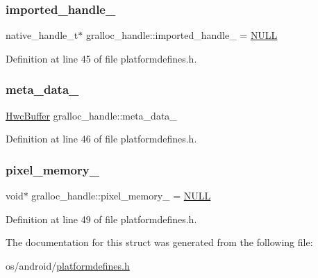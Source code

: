 \subsubsection{\texorpdfstring{imported\+\_\+handle\+\_\+}{imported\_handle\_}}
{\footnotesize\ttfamily native\+\_\+handle\+\_\+t$\ast$ gralloc\+\_\+handle\+::imported\+\_\+handle\+\_\+ = \mbox{\hyperlink{alios_2platformdefines_8h_a070d2ce7b6bb7e5c05602aa8c308d0c4}{N\+U\+LL}}}



Definition at line 45 of file platformdefines.\+h.

\mbox{\label{structgralloc__handle_aa5c246b4955a8c51868b7915c6d512ab}} 
\subsubsection{\texorpdfstring{meta\+\_\+data\+\_\+}{meta\_data\_}}
{\footnotesize\ttfamily \mbox{\hyperlink{structHwcBuffer}{Hwc\+Buffer}} gralloc\+\_\+handle\+::meta\+\_\+data\+\_\+}



Definition at line 46 of file platformdefines.\+h.

\mbox{\label{structgralloc__handle_a23cae3e928fd07aced2f0c3f3690b9f9}} 
\subsubsection{\texorpdfstring{pixel\+\_\+memory\+\_\+}{pixel\_memory\_}}
{\footnotesize\ttfamily void$\ast$ gralloc\+\_\+handle\+::pixel\+\_\+memory\+\_\+ = \mbox{\hyperlink{alios_2platformdefines_8h_a070d2ce7b6bb7e5c05602aa8c308d0c4}{N\+U\+LL}}}



Definition at line 49 of file platformdefines.\+h.



The documentation for this struct was generated from the following file\+:\begin{DoxyCompactItemize}
\item 
os/android/\mbox{\hyperlink{android_2platformdefines_8h}{platformdefines.\+h}}\end{DoxyCompactItemize}
